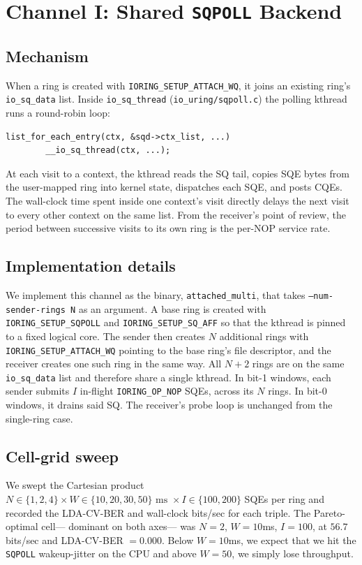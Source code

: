 \documentclass[letterpaper,twocolumn,10pt]{article}
\newcommand{\code}[1]{\texttt{#1}}
\begin{document}
\section{Channel I: Shared \code{SQPOLL} Backend}
\label{sec:ch1}
\subsection{Mechanism}
When a ring is created with \code{IORING\_SETUP\_ATTACH\_WQ}, it joins an existing ring's \code{io\_sq\_data} list. Inside \code{io\_sq\_thread} (\code{io\_uring/sqpoll.c}) the polling kthread runs a round-robin loop:
\begin{verbatim}
list_for_each_entry(ctx, &sqd->ctx_list, ...)
        __io_sq_thread(ctx, ...);
\end{verbatim}
At each visit to a context, the kthread reads the SQ tail, copies SQE bytes from the user-mapped ring into kernel state, dispatches each SQE, and posts CQEs. The wall-clock time spent inside one context's visit directly delays the next visit to every other context on the same list. From the receiver's point of review, the period between successive visits to its own ring is the per-NOP service rate.

\subsection{Implementation details}
We implement this channel as the binary, \code{attached\_multi}, that takes \code{--num-sender-rings N} as an argument. A base ring is created with \code{IORING\_SETUP\_SQPOLL} and \code{IORING\_SETUP\_SQ\_AFF} so that the kthread is pinned to a fixed logical core. The sender then creates $N$ additional rings with \code{IORING\_SETUP\_ATTACH\_WQ} pointing to the base ring's file descriptor, and the receiver creates one such ring in the same way. All $N+2$ rings are on the same \code{io\_sq\_data} list and therefore share a single kthread. In bit-1 windows, each sender submits $I$ in-flight \code{IORING\_OP\_NOP} SQEs, across its $N$ rings. In bit-0 windows, it drains said SQ. The receiver's probe loop is unchanged from the single-ring case.

\subsection{Cell-grid sweep}
We swept the Cartesian product $N \in \{1,2,4\} \times W \in \{10,20,30,50\} \text{ ms } \times I \in \{100,200\}$ SQEs per ring and recorded the LDA-CV-BER and wall-clock bits/sec for each triple. The Pareto-optimal cell--- dominant on both axes--- was $N=2$, $W = 10$ms, $I = 100$, at $56.7$ bits/sec and LDA-CV-BER $= 0.000$. Below $W = 10$ms, we expect that we hit the \code{SQPOLL} wakeup-jitter on the CPU and above $W=50$, we simply lose throughput.
\end{document}
